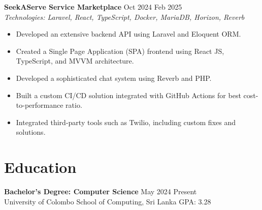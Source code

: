 \documentclass[10pt, a4paper]{article}
\begin{document}
\textbf{SeekAServe \textendash{} Service Marketplace} \hfill Oct 2024 \textendash{} Feb 2025 \\
\textit{Technologies: Laravel, React, TypeScript, Docker, MariaDB, Horizon, Reverb}
\begin{itemize}
    \item Developed an extensive backend API using Laravel and Eloquent ORM\@.
    \item Created a Single Page Application (SPA) frontend using React JS, TypeScript, and MVVM architecture.
    \item Developed a sophisticated chat system using Reverb and PHP\@.
    \item Built a custom CI/CD solution integrated with GitHub Actions for best cost-to-performance ratio.
    \item Integrated third-party tools such as Twilio, including custom fixes and solutions.
\end{itemize}

\section{Education}
\textbf{Bachelor's Degree: Computer Science} \hfill May 2024 \textendash{} Present \\
University of Colombo School of Computing, Sri Lanka \hfill GPA\@: 3.28
\end{document}
